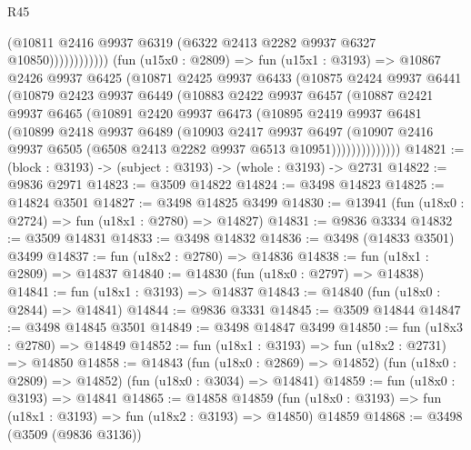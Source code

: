 \begin{lexlean}{R45}
\begin{coremodule}
                            (@10811
                              @2416
                              @9937
                              @6319
                              (@6322 @2413 @2282 @9937 @6327 @10850))))))))))))
        (fun (u15x0 : @2809) =>
        fun (u15x1 : @3193) =>
        @10867
          @2426
          @9937
          @6425
          (@10871
            @2425
            @9937
            @6433
            (@10875
              @2424
              @9937
              @6441
              (@10879
                @2423
                @9937
                @6449
                (@10883
                  @2422
                  @9937
                  @6457
                  (@10887
                    @2421
                    @9937
                    @6465
                    (@10891
                      @2420
                      @9937
                      @6473
                      (@10895
                        @2419
                        @9937
                        @6481
                        (@10899
                          @2418
                          @9937
                          @6489
                          (@10903
                            @2417
                            @9937
                            @6497
                            (@10907
                              @2416
                              @9937
                              @6505
                              (@6508 @2413 @2282 @9937 @6513 @10951))))))))))))))
@14821 := (block : @3193) -> (subject : @3193) -> (whole : @3193) -> @2731
@14822 := @9836 @2971
@14823 := @3509 @14822
@14824 := @3498 @14823
@14825 := @14824 @3501
@14827 := @3498 @14825 @3499
@14830 := @13941 (fun (u18x0 : @2724) => fun (u18x1 : @2780) => @14827)
@14831 := @9836 @3334
@14832 := @3509 @14831
@14833 := @3498 @14832
@14836 := @3498 (@14833 @3501) @3499
@14837 := fun (u18x2 : @2780) => @14836
@14838 := fun (u18x1 : @2809) => @14837
@14840 := @14830 (fun (u18x0 : @2797) => @14838)
@14841 := fun (u18x1 : @3193) => @14837
@14843 := @14840 (fun (u18x0 : @2844) => @14841)
@14844 := @9836 @3331
@14845 := @3509 @14844
@14847 := @3498 @14845 @3501
@14849 := @3498 @14847 @3499
@14850 := fun (u18x3 : @2780) => @14849
@14852 := fun (u18x1 : @3193) => fun (u18x2 : @2731) => @14850
@14858 := @14843
    (fun (u18x0 : @2869) => @14852)
    (fun (u18x0 : @2809) => @14852)
    (fun (u18x0 : @3034) => @14841)
@14859 := fun (u18x0 : @3193) => @14841
@14865 := @14858
    @14859
    (fun (u18x0 : @3193) => fun (u18x1 : @3193) => fun (u18x2 : @3193) => @14850)
    @14859
@14868 := @3498 (@3509 (@9836 @3136))

\end{coremodule}
\end{lexlean}
